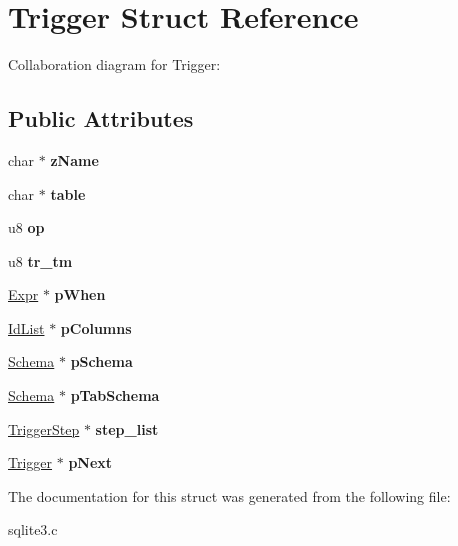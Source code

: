 \hypertarget{structTrigger}{}\section{Trigger Struct Reference}
\label{structTrigger}


Collaboration diagram for Trigger\+:
\subsection*{Public Attributes}
\begin{DoxyCompactItemize}
\item 
char $\ast$ {\bfseries z\+Name}\hypertarget{structTrigger_a9aecea5dadd7ae93b7f585c4b914791c}{}\label{structTrigger_a9aecea5dadd7ae93b7f585c4b914791c}

\item 
char $\ast$ {\bfseries table}\hypertarget{structTrigger_ab9d5500f7fc43382e867733a2968ecae}{}\label{structTrigger_ab9d5500f7fc43382e867733a2968ecae}

\item 
u8 {\bfseries op}\hypertarget{structTrigger_a855d6b6a302d8d80e1d30ddd70fd403e}{}\label{structTrigger_a855d6b6a302d8d80e1d30ddd70fd403e}

\item 
u8 {\bfseries tr\+\_\+tm}\hypertarget{structTrigger_af0d10da140b068bfd76aaeb6607fa6cf}{}\label{structTrigger_af0d10da140b068bfd76aaeb6607fa6cf}

\item 
\hyperlink{structExpr}{Expr} $\ast$ {\bfseries p\+When}\hypertarget{structTrigger_a1b6cdd46e8b98562920d1acee86281ed}{}\label{structTrigger_a1b6cdd46e8b98562920d1acee86281ed}

\item 
\hyperlink{structIdList}{Id\+List} $\ast$ {\bfseries p\+Columns}\hypertarget{structTrigger_a8505fbdf63ca9eadf4b2585e99faa4e4}{}\label{structTrigger_a8505fbdf63ca9eadf4b2585e99faa4e4}

\item 
\hyperlink{structSchema}{Schema} $\ast$ {\bfseries p\+Schema}\hypertarget{structTrigger_a83edbfa91ce6520a6ebc1a21acc2cd5e}{}\label{structTrigger_a83edbfa91ce6520a6ebc1a21acc2cd5e}

\item 
\hyperlink{structSchema}{Schema} $\ast$ {\bfseries p\+Tab\+Schema}\hypertarget{structTrigger_a8e4a9b3f4bcc5c645e1777b3bb94a6d8}{}\label{structTrigger_a8e4a9b3f4bcc5c645e1777b3bb94a6d8}

\item 
\hyperlink{structTriggerStep}{Trigger\+Step} $\ast$ {\bfseries step\+\_\+list}\hypertarget{structTrigger_a4206faaae6cdf1a2b22a2c9f15c88642}{}\label{structTrigger_a4206faaae6cdf1a2b22a2c9f15c88642}

\item 
\hyperlink{structTrigger}{Trigger} $\ast$ {\bfseries p\+Next}\hypertarget{structTrigger_ac28107e1c45789e0146fe45867b8dfdb}{}\label{structTrigger_ac28107e1c45789e0146fe45867b8dfdb}

\end{DoxyCompactItemize}


The documentation for this struct was generated from the following file\+:\begin{DoxyCompactItemize}
\item 
sqlite3.\+c\end{DoxyCompactItemize}
